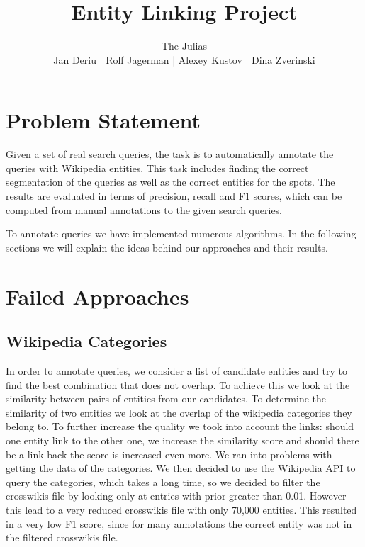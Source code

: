 \documentclass[a4paper,10pt,twocolumn]{article}
\title{Entity Linking Project}
\author{\Large{The Julias}\\Jan Deriu | Rolf Jagerman | Alexey Kustov | Dina Zverinski}
\begin{document}
\maketitle

\section{Problem Statement}
Given a set of real search queries, the task is to automatically annotate the queries with Wikipedia entities. This task includes finding the correct segmentation of the queries as well as the correct entities for the spots. The results are evaluated in terms of precision, recall and F1 scores, which can be computed from manual annotations to the given search queries.

To annotate queries we have implemented numerous algorithms. In the following sections we will explain the ideas behind our approaches and their results.

\section{Failed Approaches}

\subsection{Wikipedia Categories}
In order to annotate queries, we consider a list of candidate entities and try to find the best combination that does not overlap. To achieve this we look at the similarity between pairs of entities from our candidates. To determine the similarity of two entities we look at the overlap of the wikipedia categories they belong to. To further increase the quality we took into account the links: should one entity link to the other one, we increase the similarity score and should there be a link back the score is increased even more.
We ran into problems with getting the data of the categories. We then decided to use the Wikipedia API to query the categories, which takes a long time, so we decided to filter the crosswikis file by looking only at entries with prior greater than 0.01. However this lead to a very reduced crosswikis file with only 70,000 entities.
This resulted in a very low F1 score, since for many annotations the correct entity was not in the filtered crosswikis file.  
\end{document}
